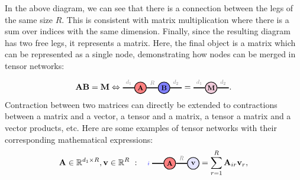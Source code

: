  In the above diagram, we can see that there is a connection between the legs of the same size $R$. This is consistent with matrix multiplication where there is a sum over indices with the same dimension. Finally, since the resulting diagram has two free legs, it represents a matrix. Here, the final object is a matrix which can be represented as  a single node, demonstrating how nodes can be merged in tensor networks:
$$
\Ab\Bb =\Mb \Leftrightarrow 
\begin{tikzpicture}[baseline=\baseline]
   \tikzset{tensor/.style = {minimum size = 0.5cm,shape = circle,thick,draw=black,inner sep = 0pt}, edge/.style = {thick,line width=.4mm},every loop/.style={}}
    \def\y{0}
    \def\x{0}
    \node[tensor,fill=red!50!white] (A) at (\x,\y){\scalebox{0.85}{$\Ab$}};
    \node[tensor,fill=blue!50!white] (B) at (\x+1,\y){\scalebox{0.85}{$\Bb$}};
    \draw[edge] (A) -- (B) node [above,midway] {\scalebox{0.7}{\dimcolor{$R$}}};
    \draw[edge] (\x-0.25,\y) -- (\x-0.75,\y)  node [midway, above] {\scalebox{0.7}{\dimcolor{$d_1$}}};
    \draw[edge] (\x+1.25,\y) -- (\x+1.75,\y)  node [midway,above] {\scalebox{0.7}{\dimcolor{$d_2$}}};
    \node[draw=none] () at (\x+2,\y) {\scalebox{1}{\textcolor{black}{$=$}}};
    \node[tensor,fill=blue!30!red!20!white] (M) at (\x+3,\y){\scalebox{0.85}{$\Mb$}};
    \draw[edge] (M) -- (\x+3.75,\y)  node [midway,above] {\scalebox{0.7}{\dimcolor{$d_2$}}};
    \draw[edge] (M) -- (\x+2.25,\y)  node [midway,above] {\scalebox{0.7}{\dimcolor{$d_1$}}};
    \end{tikzpicture}.
$$
Contraction between two matrices can directly be extended to contractions between a matrix and a vector, a tensor and a matrix, a tensor a matrix and a vector products, etc. Here are some examples of tensor networks with their corresponding mathematical expressions: 
\begin{align}\label{eq:matvec}
\Ab\in\RR^{d_1\times R},\vb\in\RR^{R} \ : \ \
\begin{tikzpicture}[baseline=\baseline]
   \tikzset{tensor/.style = {minimum size = 0.5cm,shape = circle,thick,draw=black,inner sep = 0pt}, edge/.style = {thick,line width=.4mm},every loop/.style={}}
    \def\y{0}
    \def\x{0}
    \node[tensor,fill=red!50!white] (A) at (\x,\y){\scalebox{0.85}{$\Ab$}};
    \node[tensor,fill=blue!10!white] (v) at (\x+1,\y){\scalebox{0.85}{$\vb$}};
    \draw[edge] (A) -- (v) node [above,midway] {\scalebox{0.7}{\dimcolor{$R$}}};
    \draw[edge] (\x-0.25,\y) -- (\x-0.75,\y)  node [pos=1.3]{\scalebox{0.7}{\indcolor{$i$}}};
    \end{tikzpicture}
=\sum_{r=1}^R\Ab_{ir}\vb_r,
\end{align}
